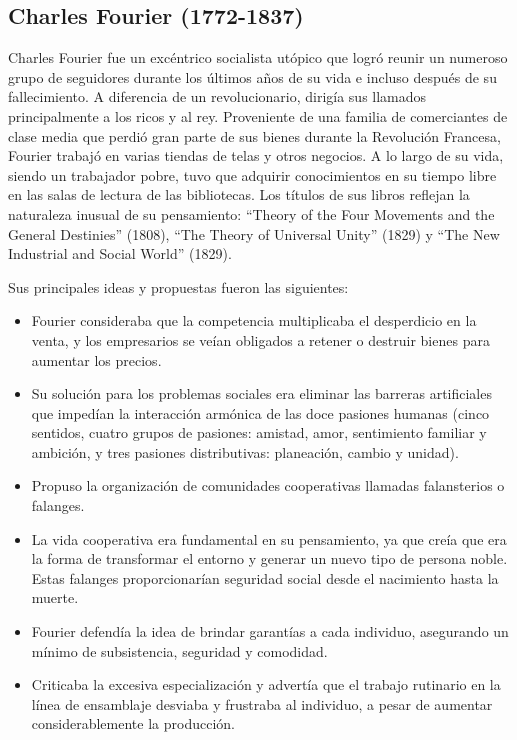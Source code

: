 \documentclass[
  jou,
  floatsintext,
  longtable,
  a4paper,
  nolmodern,
  notxfonts,
  notimes,
  12pt,
  colorlinks=true,linkcolor=blue,citecolor=blue,urlcolor=blue]{apa7}
\providecommand{\tightlist}{%
  \setlength{\itemsep}{0pt}\setlength{\parskip}{0pt}}
\begin{document}
\subsection{Charles Fourier
(1772-1837)}\label{charles-fourier-1772-1837}

Charles Fourier fue un excéntrico socialista utópico que logró reunir un
numeroso grupo de seguidores durante los últimos años de su vida e
incluso después de su fallecimiento. A diferencia de un revolucionario,
dirigía sus llamados principalmente a los ricos y al rey. Proveniente de
una familia de comerciantes de clase media que perdió gran parte de sus
bienes durante la Revolución Francesa, Fourier trabajó en varias tiendas
de telas y otros negocios. A lo largo de su vida, siendo un trabajador
pobre, tuvo que adquirir conocimientos en su tiempo libre en las salas
de lectura de las bibliotecas. Los títulos de sus libros reflejan la
naturaleza inusual de su pensamiento: ``Theory of the Four Movements and
the General Destinies'' (1808), ``The Theory of Universal Unity'' (1829)
y ``The New Industrial and Social World'' (1829).

Sus principales ideas y propuestas fueron las siguientes:

\begin{itemize}
\tightlist
\item
  Fourier consideraba que la competencia multiplicaba el desperdicio en
  la venta, y los empresarios se veían obligados a retener o destruir
  bienes para aumentar los precios.
\item
  Su solución para los problemas sociales era eliminar las barreras
  artificiales que impedían la interacción armónica de las doce pasiones
  humanas (cinco sentidos, cuatro grupos de pasiones: amistad, amor,
  sentimiento familiar y ambición, y tres pasiones distributivas:
  planeación, cambio y unidad).
\item
  Propuso la organización de comunidades cooperativas llamadas
  falansterios o falanges.
\item
  La vida cooperativa era fundamental en su pensamiento, ya que creía
  que era la forma de transformar el entorno y generar un nuevo tipo de
  persona noble. Estas falanges proporcionarían seguridad social desde
  el nacimiento hasta la muerte.
\item
  Fourier defendía la idea de brindar garantías a cada individuo,
  asegurando un mínimo de subsistencia, seguridad y comodidad.
\item
  Criticaba la excesiva especialización y advertía que el trabajo
  rutinario en la línea de ensamblaje desviaba y frustraba al individuo,
  a pesar de aumentar considerablemente la producción.
\end{itemize}
\end{document}
